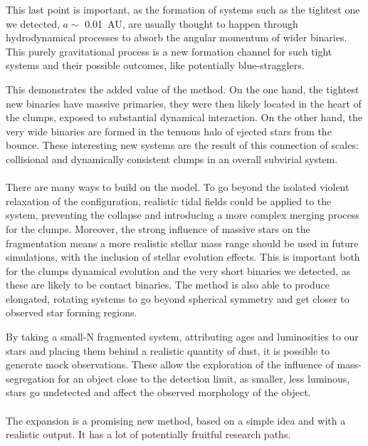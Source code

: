 This last point is important, as the formation of systems such as the tightest one we detected, $a \sim$ 0.01~AU, are usually thought to happen through hydrodynamical processes to absorb the angular momentum of wider binaries. This purely gravitational process is a new formation channel for such tight systems and their possible outcomes, like potentially blue-stragglers.

This demonstrates the added value of the \HubLem method. On the one hand, the tightest new binaries have massive primaries, they were then likely located in the heart of the clumps, exposed to substantial dynamical interaction. On the other hand, the very wide binaries are formed in the tenuous halo of ejected stars from the bounce. These interesting new systems are the result of this connection of scales: collisional and dynamically consistent clumps in an overall subvirial system.


\paragraph*{}
There are many ways to build on the \HubLem model. To go beyond the isolated violent relaxation of the configuration, realistic tidal fields could be applied to the system, preventing the collapse and introducing a more complex merging process for the clumps. Moreover, the strong influence of massive stars on the fragmentation means a more realistic stellar mass range should be used in future simulations, with the inclusion of stellar evolution effects. This is important both for the clumps dynamical evolution and the very short binaries we detected, as these are likely to be contact binaries. The \HubLem method is also able to produce elongated, rotating systems to go beyond spherical symmetry and get closer to observed star forming regions.

By taking a small-N fragmented system, attributing ages and luminosities to our stars and placing them behind a realistic quantity of dust, it is possible to generate mock observations. These allow the exploration of the influence of mass-segregation for an object close to the detection limit, as smaller, less luminous, stars go undetected and affect the observed morphology of the object.


\paragraph*{}
The \HubLem expansion is a promising new method, based on a simple idea and with a realistic output. It has a lot of potentially fruitful research paths.


